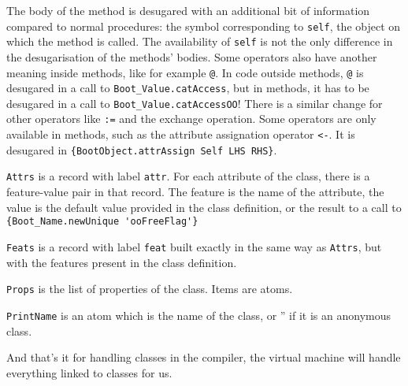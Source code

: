 \documentclass[a4paper]{memoir}
\begin{document}
The body of the method is desugared with an additional bit of information compared to normal procedures: the symbol corresponding to \lstinline!self!, the object on which the method is called. 
The availability of \lstinline!self! is not the only difference in the desugarisation of the methods' bodies. Some operators also have another meaning inside methods, like for example \lstinline!@!.
In code outside methods, \lstinline!@! is desugared in a call to
\lstinline!Boot_Value.catAccess!, but in methods, it has to be desugared in a
call to \lstinline!Boot_Value.catAccessOO!! There is a similar change for other
operators like \lstinline!:=! and the exchange operation.
Some operators are only available in methods, such as the attribute assignation
operator \lstinline!<-!. It is desugared in 
\lstinline!{BootObject.attrAssign Self LHS RHS}!.

\lstinline!Attrs! is a record with label \lstinline!attr!.
For each attribute of the class, there is a feature-value pair in that record.
The feature is the name of the attribute, the value is the default value
provided in the class definition, or the result to a call to
\lstinline!{Boot_Name.newUnique 'ooFreeFlag'}!

\lstinline!Feats! is a record with label \lstinline!feat! built exactly in the
same way as \lstinline!Attrs!, but with the features present in the class
definition.

\lstinline!Props! is the list of properties of the class. Items are atoms.

\lstinline!PrintName! is an atom which is the name of the class, or '' if it is
an anonymous class.

And that's it for handling classes in the compiler, the virtual machine will
handle everything linked to classes for us.
\end{document}

